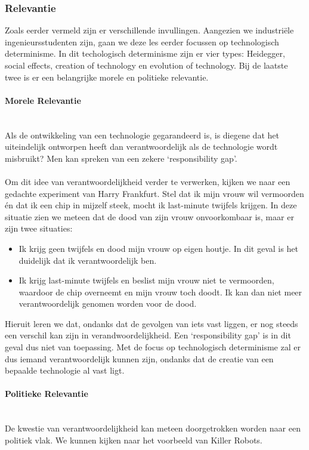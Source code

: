 \documentclass[../summary.tex]{subfiles}
\begin{document}
	\subsubsection{Relevantie}
	Zoals eerder vermeld zijn er verschillende invullingen. Aangezien we industriële ingenieursstudenten zijn, gaan we deze les eerder focussen op technologisch determinisme. In dit techologisch determinisme zijn er vier types: Heidegger, social effects, creation of technology en evolution of technology. Bij de laatste twee is er een belangrijke morele en politieke relevantie.
	
	\paragraph{Morele Relevantie} \mbox{} \\
	Als de ontwikkeling van een technologie gegarandeerd is, is diegene dat het uiteindelijk ontworpen heeft dan verantwoordelijk als de technologie wordt misbruikt? Men kan spreken van een zekere `responsibility gap'. \\
	\\
	Om dit idee van verantwoordelijkheid verder te verwerken, kijken we naar een gedachte experiment van Harry Frankfurt. Stel dat ik mijn vrouw wil vermoorden én dat ik een chip in mijzelf steek, mocht ik last-minute twijfels krijgen. In deze situatie zien we meteen dat de dood van zijn vrouw onvoorkombaar is, maar er zijn twee situaties:
	\begin{itemize}
		\item Ik krijg geen twijfels en dood mijn vrouw op eigen houtje. In dit geval is het duidelijk dat ik verantwoordelijk ben.
		\item Ik krijg last-minute twijfels en beslist mijn vrouw niet te vermoorden, waardoor de chip overneemt en mijn vrouw toch doodt. Ik kan dan niet meer verantwoordelijk genomen worden voor de dood.
	\end{itemize}
	Hieruit leren we dat, ondanks dat de gevolgen van iets vast liggen, er nog steeds een verschil kan zijn in verandwoordelijkheid. Een `responsibility gap' is in dit geval dus niet van toepassing. Met de focus op technologisch determinisme zal er dus iemand verantwoordelijk kunnen zijn, ondanks dat de creatie van een bepaalde technologie al vast ligt.
	
	 \paragraph{Politieke Relevantie} \mbox{} \\
	 De kwestie van verantwoordelijkheid kan meteen doorgetrokken worden naar een politiek vlak. We kunnen kijken naar het voorbeeld van Killer Robots.
	
\end{document}
